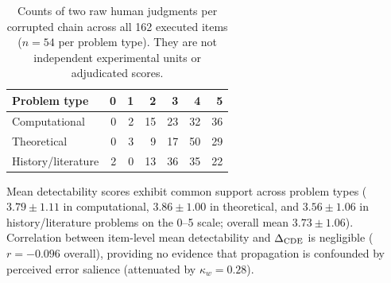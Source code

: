 \begin{table}[h]
\centering\small
\begin{tabular}{@{}lrrrrrr@{}}
\toprule Problem type & 0 & 1 & 2 & 3 & 4 & 5 \\
\midrule
Computational & 0 & 2 & 15 & 23 & 32 & 36 \\
Theoretical & 0 & 3 & 9 & 17 & 50 & 29 \\
History/literature & 2 & 0 & 13 & 36 & 35 & 22 \\
\bottomrule\end{tabular}
\caption{Counts of two raw human judgments per corrupted chain across all 162 executed items ($n=54$ per problem type). They are not independent experimental units or adjudicated scores.}
\end{table}

Mean detectability scores exhibit common support across problem types ($3.79 \pm 1.11$ in computational, $3.86 \pm 1.00$ in theoretical, and $3.56 \pm 1.06$ in history/literature problems on the 0--5 scale; overall mean $3.73 \pm 1.06$). Correlation between item-level mean detectability and $\Delta_{\mathrm{CDE}}$ is negligible ($r = -0.096$ overall), providing no evidence that propagation is confounded by perceived error salience (attenuated by $\kappa_w = 0.28$).
